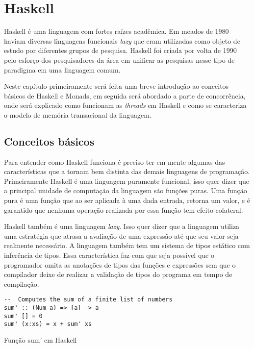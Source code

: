 \chapter{Haskell}

Haskell é uma linguagem com fortes raízes acadêmica. Em meados de 1980 haviam diversas linguagens funcionais \emph{lazy} que eram utilizadas como objeto de estudo por diferentes grupos de pesquisa. Haskell foi criada por volta de 1990 pelo esforço dos pesquisadores da área em unificar as pesquisas nesse tipo de paradigma em uma linguagem comum. \cite{o2008real}

Neste capítulo primeiramente será feita uma breve introdução ao conceitos básicos de Haskell e Monads, em seguida será abordado a parte de concorrência, onde será explicado como funcionam as \emph{threads} em Haskell e como se caracteriza o modelo de memória transacional da linguagem.


\section{Conceitos básicos}

Para entender como Haskell funciona é preciso ter em mente algumas das características que a tornam bem distinta das demais linguagens de programação. Primeiramente Haskell é uma linguagem puramente funcional, isso quer dizer que a principal unidade de computação da linguagem são funções puras. Uma função pura é uma função que ao ser aplicada à uma dada entrada, retorna um valor, e é garantido que nenhuma operação realizada por essa função tem efeito colateral.

Haskell também é uma linguagem \emph{lazy}. Isso quer dizer que a linguagem utiliza uma estratégia que atrasa a avaliação de uma expressão até que seu valor seja realmente necessário. A linguagem também tem um sistema de tipos estático com inferência de tipos. Essa característica faz com que seja possível que o programador omita as anotações de tipos das funções e expressões sem que o compilador deixe de realizar a validação de tipos do programa em tempo de compilação.

\begin{listing}
  \begin{verbatim}
--  Computes the sum of a finite list of numbers
sum' :: (Num a) => [a] -> a
sum' [] = 0
sum' (x:xs) = x + sum' xs
  \end{verbatim}
  \caption{Função sum' em Haskell}
  \label{code:sumhs}
\end{listing}

